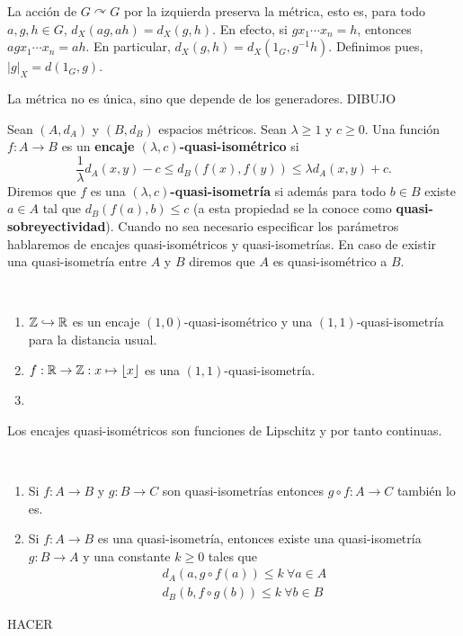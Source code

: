 \documentclass[twoside, 11pt]{article}
\begin{document}
La acción de $G \curvearrowright G$ por la izquierda preserva la métrica, esto es, para todo $a,g,h\in G$, $d_X(ag,ah)=d_X(g,h)$. En efecto, si $gx_1\cdots x_n=h$, entonces $agx_1\cdots x_n=ah$. En particular, $d_X(g,h)=d_X(1_G,g^{-1}h)$. Definimos pues, $|g|_X=d(1_G,g)$. 

\begin{observacion}
La métrica no es única, sino que depende de los generadores. DIBUJO
\end{observacion}

\begin{defi}
Sean $(A,d_A)$ y $(B,d_B)$ espacios métricos. Sean $\lambda\geq 1$ y $c\geq 0$. Una función $f:A\to B$ es un \textbf{encaje $(\lambda,c)$-quasi-isométrico} si
\[
\frac{1}{\lambda}d_A(x,y)-c\leq d_B(f(x),f(y))\leq \lambda d_A(x,y)+c.
\]
Diremos que $f$ es una \textbf{$(\lambda,c)$-quasi-isometría} si además para todo $b\in B$ existe $a\in A$ tal que $d_B(f(a),b)\leq c$ (a esta propiedad se la conoce como \textbf{quasi-sobreyectividad}). Cuando no sea necesario especificar los parámetros hablaremos de encajes quasi-isométricos y quasi-isometrías. En caso de existir una quasi-isometría entre $A$ y $B$ diremos que $A$ es quasi-isométrico a $B$.
\end{defi}

\begin{ejs}\
\begin{enumerate}
\item $\mathbb{Z}\hookrightarrow\mathbb{R}$ es un encaje $(1,0)$-quasi-isométrico y una $(1,1)$-quasi-isometría para la distancia usual.
\item $f:\mathbb{R}\to\mathbb{Z}:x\mapsto\lfloor x\rfloor$ es una $(1,1)$-quasi-isometría.
\item 
\end{enumerate}
\end{ejs}

\begin{observacion}
Los encajes quasi-isométricos son funciones de Lipschitz y por tanto continuas.
\end{observacion}

\begin{prop}\
\begin{enumerate}
\item Si $f:A\to B$ y $g:B\to C$ son quasi-isometrías entonces $g\circ f:A\to C$ también lo es.
\item Si $f:A\to B$ es una quasi-isometría, entonces existe una quasi-isometría $g:B\to A$ y una constante $k\geq 0$ tales que
\begin{align*}
d_A(a,g\circ f(a))\leq k \ \forall a\in A\\
d_B(b,f\circ g(b))\leq k \ \forall b\in B
\end{align*}
\end{enumerate}
\end{prop}
\begin{dem}
HACER
\QED
\end{dem}
\end{document}
